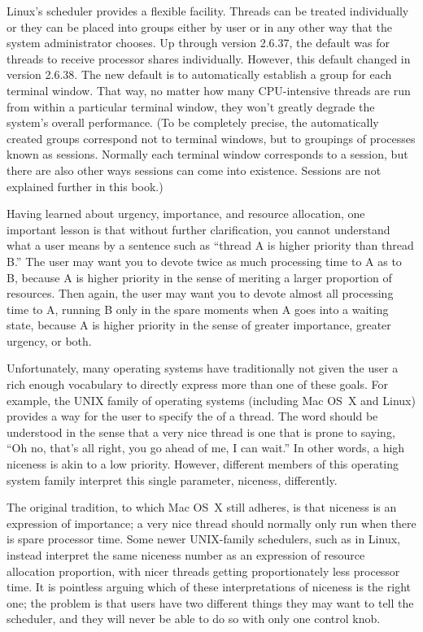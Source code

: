 Linux's scheduler provides a flexible  facility.  Threads can be treated individually or they can be placed into groups either by user or in any other way that the system administrator chooses. Up through version 2.6.37, the default was for threads to receive processor shares individually.  However, this default changed in version 2.6.38.  The new default is to automatically establish a group for each terminal window.  That way, no matter how many CPU-intensive threads are run from within a particular terminal window, they won't greatly degrade the system's overall performance.  (To be completely precise, the automatically created groups correspond not to terminal windows, but to groupings of processes known as sessions.  Normally each terminal window corresponds to a session, but there are also other ways sessions can come into existence.  Sessions are not explained further in this book.)

Having learned about urgency, importance, and resource allocation,
one important lesson is that without further clarification, you cannot
understand what a user means by a sentence such as ``thread A is
higher priority than thread B.''  The user may want you
to devote twice as much processing time to A as to B, because A is
higher priority in the sense of meriting a larger proportion of
resources.  Then again, the user may want you to devote almost all
processing time to A, running B only in the spare moments when A goes
into a waiting state, because A is higher priority in the sense of
greater importance, greater urgency, or both.

Unfortunately, many operating systems have traditionally not given the
user a rich enough vocabulary to directly express more than one of
these goals.  For example, the UNIX family of operating systems
(including Mac OS~X and Linux) provides a way for the user to specify
the  of a thread.  The word  should be understood
in the sense that a very nice thread is one that is prone to saying,
``Oh no, that's all right, you go ahead of me, I can wait.''  In other
words, a high niceness is akin to a low priority.  However, different
members of this operating system family interpret this single
parameter, niceness, differently.

The original tradition, to which Mac OS~X still adheres, is that
niceness is an expression of importance; a very nice thread should
normally only run when there is spare processor time.  Some newer
UNIX-family schedulers, such as in Linux, instead interpret the same
niceness number as an expression of resource allocation proportion,
with nicer threads getting proportionately less processor time.  It is
pointless arguing which of these interpretations of niceness is the
right one; the problem is that users have two different things they
may want to tell the scheduler, and they will never be able to do so with
only one control knob.

